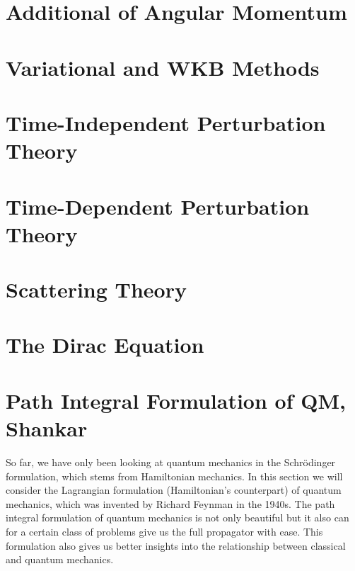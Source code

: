\documentclass{book}
\theoremstyle{definition}
\begin{document}
\newpage



\section{Additional of Angular Momentum}


\newpage



\section{Variational and WKB Methods}



\newpage


\section{Time-Independent Perturbation Theory}


\newpage



\section{Time-Dependent Perturbation Theory}


\newpage


\section{Scattering Theory}


\newpage


\section{The Dirac Equation}


\newpage


\section{Path Integral Formulation of QM, Shankar}




So far, we have only been looking at quantum mechanics in the Schr\"{o}dinger formulation, which stems from Hamiltonian mechanics. In this section we will consider the Lagrangian formulation (Hamiltonian's counterpart) of quantum mechanics, which was invented by Richard Feynman in the 1940s. The path integral formulation of quantum mechanics is not only beautiful but it also can for a certain class of problems give us the full propagator with ease. This formulation also gives us better insights into the relationship between classical and quantum mechanics. \\
\end{document}
